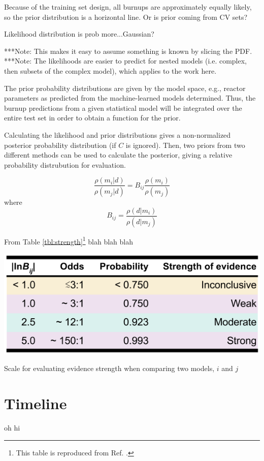 Because of the training set design, all burnups are approximately equally
likely, so the prior distribution is a horizontal line. Or is prior coming from
CV sets?

Likelihood distribution is prob more...Gaussian? 

***Note: This makes it easy to assume something is known by slicing the PDF.
***Note: The likelihoods are easier to predict for nested models (i.e. complex, 
then subsets of the complex model), which applies to the work here.

The prior probability distributions are given by the model space, e.g., reactor
parameters as predicted from the machine-learned models determined.  Thus, the
burnup predictions from a given statistical model will be integrated over the entire test set
in order to obtain a function for the prior.

Calculating the likelihood and prior distributions gives a non-normalized
posterior probability distribution (if $C$ is ignored).  Then, two priors from
two different methods can be used to calculate the posterior, giving a relative
probability distrubution for evaluation. 

\begin{equation}
\label{eq:postodds}
  \frac{\rho(m_i|d)}{\rho(m_j|d)} = B_{ij} \frac{\rho(m_i)}{\rho(m_j)}
\end{equation}
where $$B_{ij} = \frac{\rho(d|m_i)}{\rho(d|m_j)}$$

From Table \ref{tbl:strength}\footnote{This table is reproduced from Ref.
\cite{bayes_compare}.} blah blah blah
\begin{table}
  \includegraphics[width=\linewidth]{./chapters/proposal/evidence-strength.png}
  \caption{Scale for evaluating evidence strength when comparing two models, $i$ and $j$}
  \label{tbl:strength}
\end{table}

\cite{inverse_theory, gentle_bayes, bayes_compare}

\section{Timeline}
\label{sec:timeline}

oh hi
